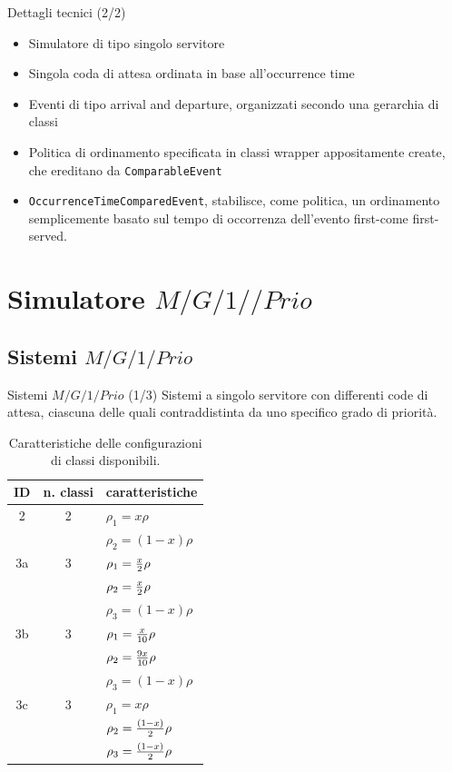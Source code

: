 \documentclass[slidestop,compress,mathserif]{beamer}
\begin{document}
\begin{frame}{Dettagli tecnici (2/2)}
\vfill
\begin{itemize}
	\item Simulatore di tipo singolo servitore
	\item Singola coda di attesa ordinata in base all'occurrence time
	\item Eventi di tipo arrival and departure, organizzati secondo una gerarchia di classi
	\item Politica di ordinamento specificata in classi wrapper appositamente create, che ereditano da {\tt ComparableEvent}
	\item {\tt OccurrenceTimeComparedEvent}, stabilisce, come politica, un ordinamento semplicemente basato sul tempo di occorrenza dell'evento first-come first-served.
\end{itemize}
\vfill
\end{frame}

\section{Simulatore $M/G/1//Prio$}
\subsection{Sistemi $M/G/1/Prio$}
\begin{frame}{Sistemi $M/G/1/Prio$ (1/3)}
Sistemi a singolo servitore con differenti code di attesa, ciascuna delle quali contraddistinta da uno specifico grado di priorit\`a. 
\footnotesize
\begin{table}[!h]
	\begin{center}
	\begin{tabular}{|ccl|}
	\hline
	ID  & n. classi & caratteristiche\\
	\hline
	2 & 2 & $\rho_{1}=x\rho$  \\
	& & $\rho_{2}=(1-x)\rho$ \\
	\hline
	3a & 3 & $\rho_{1}={x\over2}\rho$  \\
	& & $\rho_{2}={x\over2}\rho$  \\
	& & $\rho_{3}=(1-x)\rho$  \\
	\hline
	3b & 3 & $\rho_{1}={x\over10}\rho$ \\
	& & $\rho_{2}={9x\over10}\rho$  \\
	& & $\rho_{3}=(1-x)\rho$  \\
	\hline
	3c & 3 & $\rho_{1}=x\rho$ \\
	& & $\rho_{2}={(1-x)\over2}\rho$  \\
	& & $\rho_{3}={(1-x)\over2}\rho$  \\
	\hline
	\end{tabular}
	\end{center}
	\caption{Caratteristiche delle configurazioni di classi disponibili.}
	\label{tab:mg1prioclasses}
\end{table}
\normalsize
\end{frame}
\end{document}
